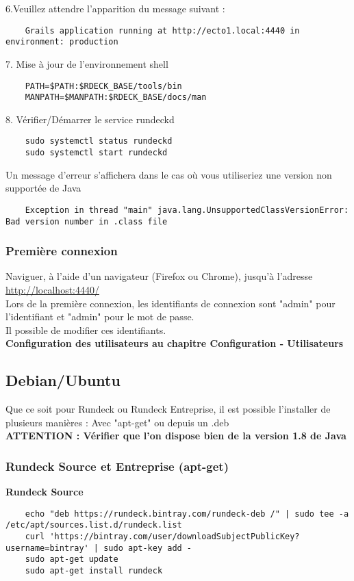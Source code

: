 \documentclass[12pt]{article}
\begin{document}
6.Veuillez attendre l'apparition du message suivant :
\begin{lstlisting}
    Grails application running at http://ecto1.local:4440 in environment: production
\end{lstlisting}

7. Mise à jour de l'environnement shell
\begin{lstlisting}
    PATH=$PATH:$RDECK_BASE/tools/bin
    MANPATH=$MANPATH:$RDECK_BASE/docs/man
\end{lstlisting}

8. Vérifier/Démarrer le service rundeckd
\begin{lstlisting}
    sudo systemctl status rundeckd
    sudo systemctl start rundeckd
\end{lstlisting}

Un message d'erreur s'affichera dans le cas où vous utiliseriez une version non supportée de Java
\begin{lstlisting}
    Exception in thread "main" java.lang.UnsupportedClassVersionError: Bad version number in .class file
\end{lstlisting}

\subsubsection{Première connexion}
Naviguer, à l'aide d'un navigateur (Firefox ou Chrome), jusqu'à l'adresse \url{ http://localhost:4440/}
\\
Lors de la première connexion, les identifiants de connexion sont "admin" pour l'identifiant et "admin" pour le mot de passe.
\\
Il possible de modifier ces identifiants.
\vspace{0.5cm}
\\
\textbf{Configuration des utilisateurs au chapitre Configuration - Utilisateurs}

\subsection{Debian/Ubuntu}
Que ce soit pour Rundeck ou Rundeck Entreprise, il est possible l'installer de plusieurs manières : Avec "apt-get" ou depuis un .deb
\\
\textbf{ATTENTION : Vérifier que l'on dispose bien de la version 1.8 de Java}

\subsubsection{Rundeck Source et Entreprise (apt-get)}
\textbf{Rundeck Source}
\begin{lstlisting}
    echo "deb https://rundeck.bintray.com/rundeck-deb /" | sudo tee -a /etc/apt/sources.list.d/rundeck.list
    curl 'https://bintray.com/user/downloadSubjectPublicKey?username=bintray' | sudo apt-key add -
    sudo apt-get update
    sudo apt-get install rundeck
\end{lstlisting}
\end{document}
